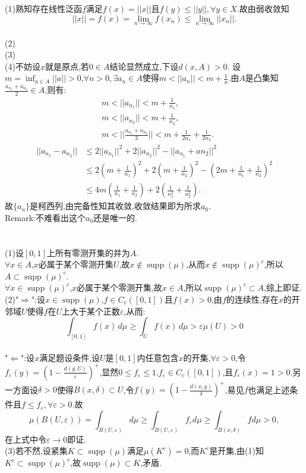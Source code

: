 \documentclass{article}
\DeclareMathOperator{\supp}{supp}
\begin{document}
\section{}
\noindent (1)熟知存在线性泛函$f$满足$f(x)=||x||$且$f(y)\leq||y||,\forall y\in X.$故由弱收敛知$$||x||=f(x)=\lim_{n\rightarrow\infty}f(x_{n})\leq\lim_{n\rightarrow\infty}||x_{n}||.$$\\
(2)\\
(3)\\
(4)不妨设$x$就是原点,若$0\in A$结论显然成立,下设$d(x,A)>0$.
设$m=\inf_{a\in A}||a||>0$,$\forall n>0,\exists a_n\in A$使得$m<||a_n||<m+\frac{1}{n}$.由$A$是凸集知$\frac{a_{n_1}+a_{n_2}}{2}\in A$,则有:\begin{align}
    &m<||a_{n_1}||<m+\frac{1}{n_1},\\
    &m<||a_{n_2}||<m+\frac{1}{n_2},\\
    &m<||\frac{a_{n_1}+a_{n_2}}{2}||<m+\frac{1}{2n_1}+\frac{1}{2n_2}.
\end{align}
\begin{align}
    ||a_{n_1}-a_{n_2}||&\leq 2||a_{n_1}||^2+2||a_{n_2}||^2-||a_{n_1}+a{n_2}||^2\\&\leq 2(m+\frac{1}{n_1})^2+2(m+\frac{1}{n_2})^2-(2m+\frac{1}{n_1}+\frac{1}{n_2})^2\\&\leq 4m(\frac{1}{n_1}+\frac{1}{n_2})+2(\frac{1}{n_1^2}+\frac{1}{n_2^2}).
\end{align}
故$\{a_n\}$是柯西列,由完备性知其收敛,收敛结果即为所求$a_0$.\\
Remark:不难看出这个$a_0$还是唯一的.\\
\section{}
\noindent(1)设$[0,1]$上所有零测开集的并为$A$.\\
$\forall x\in A$,$x$必属于某个零测开集$U$,故$x\notin\supp(\mu)$,从而$x\notin\supp(\mu)^{c}$,所以$A\subset \supp(\mu)^{c}$.\\
$\forall x\in \supp(\mu)^{c}$,$x$必属于某个零测开集,故$x\in A$,所以$\supp(\mu)^{c}\subset A$,综上即证.\\
(2)"$\Rightarrow$":设$x\in\supp(\mu)$,$f\in C_{c}([0,1])$且$f(x)>0$,由$f$的连续性,存在$x$的开邻域$U$使得$f$在$U$上大于某个正数$\varepsilon$,从而:$$\int_{[0,1]}f(x)\,d\mu\geq\int_{U}f(x)\,d\mu >\varepsilon\mu(U)>0$$\\
"$\Leftarrow$":设$x$满足题设条件,设$U$是$[0,1]$内任意包含$x$的开集,$\forall\varepsilon>0$,令$f_{\varepsilon}(y)=(1-\frac{d(y,U)}{\varepsilon})^{+}$,显然$0\leq f_{\varepsilon}\leq 1$,$f_{\varepsilon}\in C_{c}([0,1])$,且$f_{\varepsilon}(x)=1>0$.另一方面设$\delta>0$使得$B(x,\delta)\subset U$,令$f(y)=(1-\frac{d(x,y)}{\delta})^{+}$,易见$f$也满足上述条件且$f\leq f_{\varepsilon},\forall\varepsilon>0$.故$$\mu(B(U,\varepsilon))=\int_{B(U,\varepsilon)}d\mu\geq\int_{B(U,\varepsilon)}f_{\varepsilon}d\mu\geq\int_{B(x,\delta)}fd\mu>0,$$在上式中令$\varepsilon\rightarrow 0$即证.\\
(3)若不然,设紧集$K\subset\supp(\mu)$满足$\mu(K^c)=0$,而$K^c$是开集,由(1)知$K^c\subset\supp(\mu)^c$,故$\supp(\mu)\subset K$,矛盾.\\
\end{document}
